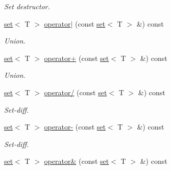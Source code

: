 \begin{DoxyCompactItemize}
\begin{DoxyCompactList}\small\item\em Set destructor. \end{DoxyCompactList}\item 
\hyperlink{classmerlin_1_1set}{set}$<$ T $>$ \hyperlink{classmerlin_1_1set_a13ebc00884144896d3cafb6552cd760a}{operator$\vert$} (const \hyperlink{classmerlin_1_1set}{set}$<$ T $>$ \&) const \hypertarget{classmerlin_1_1set_a13ebc00884144896d3cafb6552cd760a}{}\label{classmerlin_1_1set_a13ebc00884144896d3cafb6552cd760a}

\begin{DoxyCompactList}\small\item\em Union. \end{DoxyCompactList}\item 
\hyperlink{classmerlin_1_1set}{set}$<$ T $>$ \hyperlink{classmerlin_1_1set_affa59b7a3c25985c36cfa8d13f005f5c}{operator+} (const \hyperlink{classmerlin_1_1set}{set}$<$ T $>$ \&) const \hypertarget{classmerlin_1_1set_affa59b7a3c25985c36cfa8d13f005f5c}{}\label{classmerlin_1_1set_affa59b7a3c25985c36cfa8d13f005f5c}

\begin{DoxyCompactList}\small\item\em Union. \end{DoxyCompactList}\item 
\hyperlink{classmerlin_1_1set}{set}$<$ T $>$ \hyperlink{classmerlin_1_1set_a53f01cf729d6762f3aad050a3c80ad74}{operator/} (const \hyperlink{classmerlin_1_1set}{set}$<$ T $>$ \&) const \hypertarget{classmerlin_1_1set_a53f01cf729d6762f3aad050a3c80ad74}{}\label{classmerlin_1_1set_a53f01cf729d6762f3aad050a3c80ad74}

\begin{DoxyCompactList}\small\item\em Set-\/diff. \end{DoxyCompactList}\item 
\hyperlink{classmerlin_1_1set}{set}$<$ T $>$ \hyperlink{classmerlin_1_1set_ab5230f892f1e830152477325ad03985f}{operator-\/} (const \hyperlink{classmerlin_1_1set}{set}$<$ T $>$ \&) const \hypertarget{classmerlin_1_1set_ab5230f892f1e830152477325ad03985f}{}\label{classmerlin_1_1set_ab5230f892f1e830152477325ad03985f}

\begin{DoxyCompactList}\small\item\em Set-\/diff. \end{DoxyCompactList}\item 
\hyperlink{classmerlin_1_1set}{set}$<$ T $>$ \hyperlink{classmerlin_1_1set_ab140657855d16aafab6f16cb57409a64}{operator\&} (const \hyperlink{classmerlin_1_1set}{set}$<$ T $>$ \&) const \hypertarget{classmerlin_1_1set_ab140657855d16aafab6f16cb57409a64}{}\label{classmerlin_1_1set_ab140657855d16aafab6f16cb57409a64}


\end{DoxyCompactItemize}
